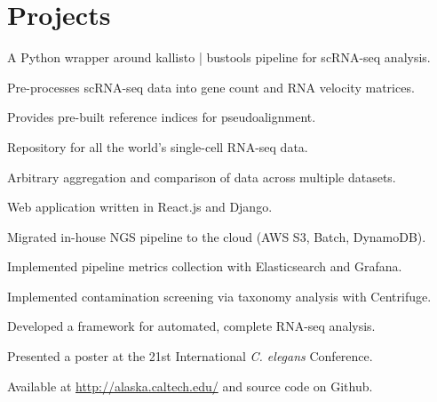 \documentclass[]{resume}
\begin{document}
\begin{minipage}[t]{0.66\textwidth}


\section{Projects}
\vspace{\topsep} %
\begin{tightemize}
\item A Python wrapper around kallisto | bustools pipeline for scRNA-seq analysis.
\item Pre-processes scRNA-seq data into gene count and RNA velocity matrices.
\item Provides pre-built reference indices for pseudoalignment.
\end{tightemize}
\sectionsep

\begin{tightemize}
\item Repository for all the world's single-cell RNA-seq data.
\item Arbitrary aggregation and comparison of data across multiple datasets.
\item Web application written in React.js and Django.
\end{tightemize}
\sectionsep

\begin{tightemize}
\item Migrated in-house NGS pipeline to the cloud (AWS S3, Batch, DynamoDB).
\item Implemented pipeline metrics collection with Elasticsearch and Grafana.
\item Implemented contamination screening via taxonomy analysis with Centrifuge.
\end{tightemize}
\sectionsep

\begin{tightemize}
\item Developed a framework for automated, complete RNA-seq analysis.
\item Presented a poster at the 21st International \textit{C. elegans} Conference.
\item Available at \textcolor{blue}{ \href{http://alaska.caltech.edu/}{http://alaska.caltech.edu/}} and source code on Github.
\end{tightemize}
\sectionsep


\end{minipage}
\end{document}
